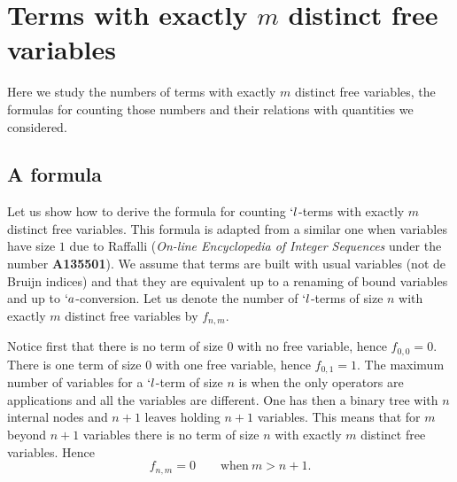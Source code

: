 \documentclass{jfp1}
\begin{document}
\appendix

\section{Terms with exactly $m$ distinct free variables}
\label{sec:number-terms-with}

Here we study the numbers of terms with exactly $m$ distinct
free variables, the formulas for counting those numbers and their relations with
quantities we considered.

\subsection{A formula}
\label{sec:formula}

Let us show how to derive the formula for counting $`l$-terms with exactly $m$
distinct free variables.  This formula is adapted from a similar one when variables
have size $1$ due to Raffalli (\emph{On-line Encyclopedia of Integer Sequences}
under the number \textbf{A135501}).  We assume that terms are built with usual variables
(not de Bruijn indices) and that they are equivalent up to a renaming of bound variables
and up to $`a$-conversion.  Let us denote the number of $`l$-terms of size $n$ with
exactly $m$ distinct free variables by $f_{n,m}$.

Notice first that there is no term of size $0$ with no free variable, hence $f_{0,0}
= 0$.  There is one term of size $0$ with one free variable, hence $f_{0,1} = 1$.  The maximum number of variables for
a $`l$-term of size $n$ is when the only operators are applications and all the
variables are different.  One has then a binary tree with $n$ internal nodes and
$n+1$ leaves holding $n+1$ variables.  This means that for $m$ beyond $n+1$ variables
there is no term of size $n$ with exactly $m$ distinct free variables.  Hence
\[ f_{n,m} =0 \qquad \textrm{when} ~ m > n+1.\]
\end{document}
